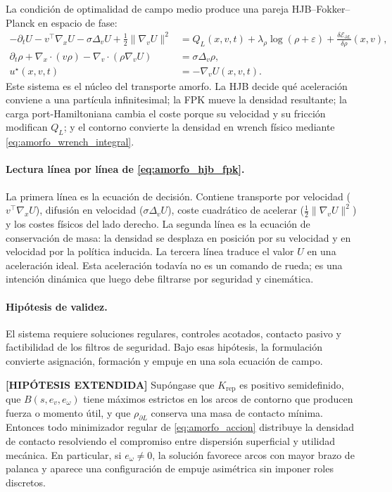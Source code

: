 La condición de optimalidad de campo medio produce una pareja HJB--Fokker--Planck en
espacio de fase:
\begin{equation}
\begin{aligned}
  -\partial_t U
  -v^\top\nabla_xU
  -\sigma\Delta_vU
  +\frac12\|\nabla_vU\|^2
  &=
  Q_L(x,v,t)
  +\lambda_\rho\log(\rho+\varepsilon)
  +\frac{\delta\mathcal E_{\partial L}}{\delta\rho}(x,v),\\
  \partial_t\rho
  +\nabla_x\!\cdot(v\rho)
  -\nabla_v\!\cdot(\rho\nabla_vU)
  &=
  \sigma\Delta_v\rho,\\
  u^\star(x,v,t)&=-\nabla_vU(x,v,t).
\end{aligned}
\label{eq:amorfo_hjb_fpk}
\end{equation}
Este sistema es el núcleo del transporte amorfo. La HJB decide qué aceleración conviene
a una partícula infinitesimal; la FPK mueve la densidad resultante; la carga
port-Hamiltoniana cambia el coste porque su velocidad y su fricción modifican
$Q_L$; y el contorno convierte la densidad en wrench físico mediante
\eqref{eq:amorfo_wrench_integral}.

\paragraph{Lectura línea por línea de \eqref{eq:amorfo_hjb_fpk}.}
La primera línea es la ecuación de decisión. Contiene transporte por velocidad
($v^\top\nabla_xU$), difusión en velocidad ($\sigma\Delta_vU$), coste cuadrático de
acelerar ($\frac12\|\nabla_vU\|^2$) y los costes físicos del lado derecho. La segunda
línea es la ecuación de conservación de masa: la densidad se desplaza en posición por su
velocidad y en velocidad por la política inducida. La tercera línea traduce el valor
$U$ en una aceleración ideal. Esta aceleración todavía no es un comando de rueda; es una
intención dinámica que luego debe filtrarse por seguridad y cinemática.

\paragraph{Hipótesis de validez.}
El sistema requiere soluciones regulares, controles acotados, contacto pasivo y
factibilidad de los filtros de seguridad. Bajo esas hipótesis, la formulación convierte
asignación, formación y empuje en una sola ecuación de campo.

\begin{proposicion} \textbf{[HIPÓTESIS EXTENDIDA]}
\label{prop:amorfo_caging}
Supóngase que $K_{\mathrm{rep}}$ es positivo semidefinido, que $B(s,e_v,e_\omega)$ tiene
máximos estrictos en los arcos de contorno que producen fuerza o momento útil, y que
$\rho_{\partial L}$ conserva una masa de contacto mínima. Entonces todo minimizador
regular de \eqref{eq:amorfo_accion} distribuye la densidad de contacto resolviendo el
compromiso entre dispersión superficial y utilidad mecánica. En particular, si
$e_\omega\ne0$, la solución favorece arcos con mayor brazo de palanca y aparece una
configuración de empuje asimétrica sin imponer roles discretos.
\end{proposicion}

